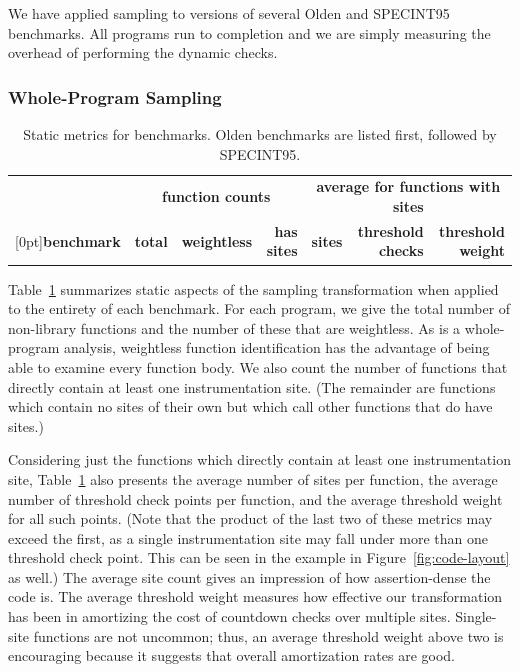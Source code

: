We have applied sampling to \CCured versions of several Olden
\cite{Carlisle:1996:OPPWDDSDMM} and SPECINT95 \cite{SPEC95} benchmarks.
All programs run to completion and we are simply measuring
the overhead of performing the dynamic checks.

\subsubsection{Whole-Program Sampling}
\label{sec:share:whole}

\begin{table}[tb]
  \centering
  \small
  \begin{tabular}{|l|rrr|rrr|}
    \hline
    & \multicolumn{3}{c|}{\textbf{function counts}} & \multicolumn{3}{c|}{\textbf{average for functions with sites}} \\
    \raisebox{1.5ex}[0pt]{\textbf{benchmark}} & \textbf{total} & \textbf{weightless} & \textbf{has sites} & \textbf{sites} & \textbf{threshold checks} & \textbf{threshold weight} \\
    \hline\hline
    
  \end{tabular}
  \caption{Static metrics for \CCured benchmarks.  Olden benchmarks
    are listed first, followed by SPECINT95.}
  \label{tab:share:static}
\end{table}

Table~\ref{tab:share:static} summarizes static aspects of the sampling
transformation when applied to the entirety of each benchmark.  For
each program, we give the total number of non-library functions and
the number of these that are weightless.  As \CCured is a
whole-program analysis, weightless function identification has the
advantage of being able to examine every function body.  We also count
the number of functions that directly contain at least one
instrumentation site.  (The remainder are functions which contain no
sites of their own but which call other functions that do have sites.)

Considering just the functions which directly contain at least one
instrumentation site, Table~\ref{tab:share:static} also presents the
average number of sites per function, the average number of threshold
check points per function, and the average threshold weight for all
such points.  (Note that the product of the last two of these metrics
may exceed the first, as a single instrumentation site may fall under
more than one threshold check point.  This can be seen in the example
in Figure~\ref{fig:code-layout} as well.)  The average site count
gives an impression of how assertion-dense the code is.  The average
threshold weight measures how effective our transformation has been in
amortizing the cost of countdown checks over multiple sites.
Single-site functions are not uncommon; thus, an average threshold
weight above two is encouraging because it suggests that overall
amortization rates are good.

